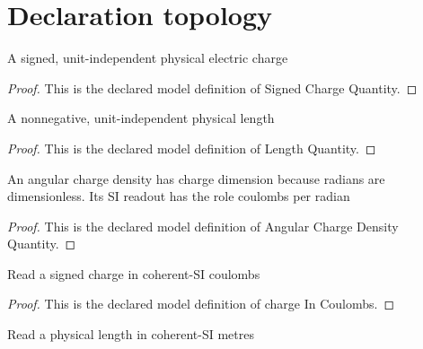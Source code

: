 \section{Declaration topology}
\begin{definition}
  \label{def:physics:phyx-mini-0995:phyxminiproblems-problemphyxmini0995-signedchargequantity}
  A signed, unit-independent physical electric charge
\end{definition}
\begin{proof}
  This is the declared model definition of Signed Charge Quantity.
\end{proof}
\begin{definition}
  \label{def:physics:phyx-mini-0995:phyxminiproblems-problemphyxmini0995-lengthquantity}
  A nonnegative, unit-independent physical length
\end{definition}
\begin{proof}
  This is the declared model definition of Length Quantity.
\end{proof}
\begin{definition}
  \label{def:physics:phyx-mini-0995:phyxminiproblems-problemphyxmini0995-angularchargedensityquantity}
  An angular charge density has charge dimension because radians are dimensionless. Its SI readout has the role coulombs per radian
\end{definition}
\begin{proof}
  This is the declared model definition of Angular Charge Density Quantity.
\end{proof}
\begin{definition}
  \label{def:physics:phyx-mini-0995:phyxminiproblems-problemphyxmini0995-chargeincoulombs}
  Read a signed charge in coherent-SI coulombs
\end{definition}
\begin{proof}
  This is the declared model definition of charge In Coulombs.
\end{proof}
\begin{definition}
  \label{def:physics:phyx-mini-0995:phyxminiproblems-problemphyxmini0995-lengthinmeters}
  Read a physical length in coherent-SI metres
\end{definition}
